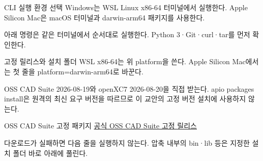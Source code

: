 \begin{frame}{CLI 실행 환경 선택}
\small
Windows는 WSL Linux x86-64 터미널에서 실행한다. Apple Silicon Mac은 macOS 터미널과 darwin-arm64 패키지를 사용한다.\par\vspace{0.26cm}아래 명령은 같은 터미널에서 순서대로 실행한다. Python 3·Git·curl·tar를 먼저 확인한다.\par{}
\end{frame}

\begin{frame}{고정 릴리스와 설치 폴더}
\small
{}WSL x86-64는 위 platform을 쓴다. Apple Silicon Mac에서는 첫 줄을 platform=darwin-arm64로 바꾼다.\par\vspace{0.26cm}OSS CAD Suite 2026-08-19와 openXC7 2026-08-20을 직접 받는다. apio packages install은 원격의 최신 요구 버전을 따르므로 이 교안의 고정 버전 설치에 사용하지 않는다.\par
\end{frame}

\begin{frame}{OSS CAD Suite 고정 패키지}
\small
{}\href{https://github.com/fpgawars/tools-oss-cad-suite/releases/tag/2026-08-19}{공식 OSS CAD Suite 고정 릴리스}\par\vspace{0.2cm}다운로드가 실패하면 다음 줄을 실행하지 않는다. 압축 내부의 bin·lib 등은 지정한 설치 폴더 바로 아래에 풀린다.\par
\end{frame}

